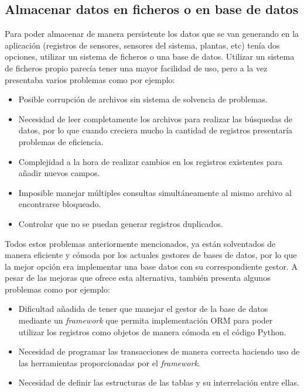     \subsection{Almacenar datos en ficheros o en base de datos}
    Para poder almacenar de manera persistente los datos que se van generando en la aplicación (registros de sensores, sensores del sistema, plantas, etc) tenía dos opciones, utilizar un sistema de ficheros o una base de datos. 
    Utilizar un sistema de ficheros propio parecía tener una mayor facilidad de uso, pero a la vez presentaba varios problemas como por ejemplo:
    \begin{itemize}
        \item Posible corrupción de archivos sin sistema de solvencia de problemas.
        \item Necesidad de leer completamente los archivos para realizar las búsquedas de datos, por lo que cuando creciera mucho la cantidad de registros presentaría problemas de eficiencia.
        \item Complejidad a la hora de realizar cambios en los registros existentes para añadir nuevos campos.
        \item Imposible manejar múltiples consultas simultáneamente al mismo archivo al encontrarse bloqueado.
        \item Controlar que no se puedan generar registros duplicados.
    \end{itemize}    
    Todos estos problemas anteriormente mencionados, ya están solventados de manera eficiente y cómoda por los actuales gestores de bases de datos, por lo que la mejor opción era implementar una base datos con su correspondiente gestor. A pesar de las mejoras que ofrece esta alternativa, también presenta algunos problemas como por ejemplo:
    \begin{itemize}
        \item Dificultad añadida de tener que manejar el gestor de la base de datos mediante un \textit{framework} que permita implementación ORM para poder utilizar los registros como objetos de manera cómoda en el código Python.
        \item Necesidad de programar las transacciones de manera correcta haciendo uso de las herramientas proporcionadas por el \textit{framework}.
        \item Necesidad de definir las estructuras de las tablas y su interrelación entre ellas.
    \end{itemize}
